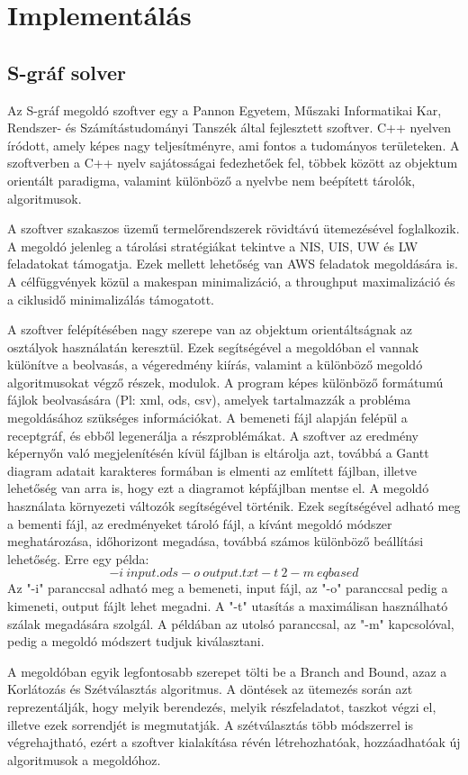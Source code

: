 \chapter{Implementálás}
\section{S-gráf solver}
Az S-gráf megoldó szoftver egy a Pannon Egyetem, Műszaki Informatikai Kar, Rendszer- és Számítástudományi Tanszék által fejlesztett szoftver. C++ nyelven íródott, amely képes nagy teljesítményre, ami fontos a tudományos területeken. A szoftverben a C++ nyelv sajátosságai fedezhetőek fel, többek között az objektum orientált paradigma, valamint különböző a nyelvbe nem beépített tárolók, algoritmusok.

A szoftver szakaszos üzemű termelőrendszerek rövidtávú ütemezésével foglalkozik. A megoldó jelenleg a tárolási stratégiákat tekintve a NIS, UIS, UW és LW feladatokat támogatja. Ezek mellett lehetőség van AWS feladatok megoldására is. A célfüggvények közül a makespan minimalizáció, a throughput maximalizáció és a ciklusidő minimalizálás támogatott.

A szoftver felépítésében nagy szerepe van az objektum orientáltságnak az osztályok használatán keresztül. Ezek segítségével a megoldóban el vannak különítve a beolvasás, a végeredmény kiírás, valamint a különböző megoldó algoritmusokat végző részek, modulok. A program képes különböző formátumú fájlok beolvasására (Pl: xml, ods, csv), amelyek tartalmazzák a probléma megoldásához szükséges információkat. A bemeneti fájl alapján felépül a receptgráf, és ebből legenerálja a részproblémákat. A szoftver az eredmény képernyőn való megjelenítésén kívül fájlban is eltárolja azt, továbbá a Gantt diagram adatait karakteres formában is elmenti az említett fájlban, illetve lehetőség van arra is, hogy ezt a diagramot képfájlban mentse el. A megoldó használata környezeti változók segítségével történik. Ezek segítségével adható meg a bementi fájl, az eredményeket tároló fájl, a kívánt megoldó módszer meghatározása, időhorizont megadása, továbbá számos különböző beállítási lehetőség. Erre egy példa: $$-i\:input.ods -o\: output.txt -t\:2 -m\:eqbased$$ Az "-i" paranccsal adható meg a bemeneti, input fájl, az "-o" paranccsal pedig a kimeneti, output fájlt lehet megadni. A "-t" utasítás a maximálisan használható szálak megadására szolgál. A példában az utolsó paranccsal, az "-m" kapcsolóval, pedig a megoldó módszert tudjuk kiválasztani.

A megoldóban egyik legfontosabb szerepet tölti be a Branch and Bound, azaz a Korlátozás és Szétválasztás algoritmus. A döntések az ütemezés során azt reprezentálják, hogy melyik berendezés, melyik részfeladatot, taszkot végzi el, illetve ezek sorrendjét is megmutatják. A szétválasztás több módszerrel is végrehajtható, ezért a szoftver kialakítása révén létrehozhatóak, hozzáadhatóak új algoritmusok a megoldóhoz.
